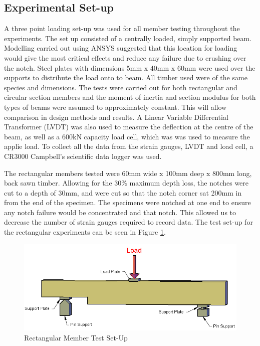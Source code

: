 \documentclass[11pt,a4paper]{article}
\numberwithin{equation}{subsection}
\begin{document}
\subsection{Experimental Set-up}
A three point loading set-up was used for all member testing throughout the experiments. The set up consisted of a centrally loaded, simply supported beam. Modelling carried out using ANSYS suggested that this location for loading would give the most critical effects and reduce any failure due to crushing over the notch. Steel plates with dimensions 5mm x 40mm x 60mm were used over the supports to distribute the load onto to beam. All timber used were of the same species and dimensions. The tests were carried out for both rectangular and circular section members and the moment of inertia and section modulus for both types of beams were assumed to approximately constant. This will allow comparison in design methods and results. A Linear Variable Differential Transformer (LVDT) was also used to measure the deflection at the centre of the beam, as well as a 600kN capacity load cell, which was was used to measure the applie load. To collect all the data from the strain gauges, LVDT and load cell, a CR3000 Campbell's scientific data logger was used.

\vspace*{\baselineskip}

\noindent
The rectangular members tested were 60mm wide x 100mm deep x 800mm long, back sawn timber. Allowing for the 30\% maximum depth loss, the notches were cut to a depth of 30mm, and were cut so that the notch corner sat 200mm in from the end of the specimen.  The specimens were notched at one end to ensure any notch failure would be concentrated and that notch. This allowed us to decrease the number of strain gauges required to record data. The test set-up for the rectangular experiments can be seen in Figure \ref{fig:rect}.

\begin{figure}[h]
	\begin{center}
		\includegraphics[scale=0.55]{Rectangular_Set_up}
	\end{center}
	\caption{Rectangular Member Test Set-Up}
	\label{fig:rect}
\end{figure}
\end{document}

